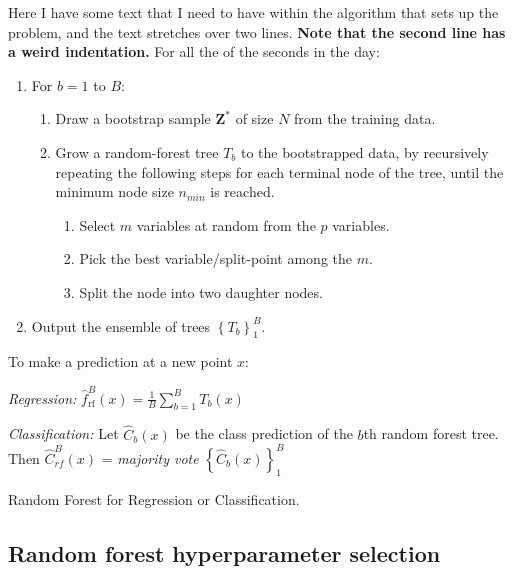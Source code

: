 \begin{algorithm}
    \footnotesize
    \begin{minipage}{.92\linewidth}
    Here I have some text that I need to have within the algorithm that
    sets up the problem, and the text stretches over two  lines.
    \textbf{Note that the second line has a weird indentation.}
    \BlankLine
    For all the of the seconds in the day:
    \begin{enumerate}
        \item For $b = 1$ to $B$:
        \begin{enumerate}
            \item Draw a bootstrap sample $\bm{Z}^{*}$ of size $N$ from the training data.
            \item Grow a random-forest tree $T_b$ to the bootstrapped data, by recursively repeating the following steps for each terminal node of the tree, until the minimum node size $n_{min}$ is reached.
            \begin{enumerate}
                \item Select $m$ variables at random from the $p$ variables.
                \item Pick the best variable/split-point among the $m$.
                \item Split the node into two daughter nodes.
            \end{enumerate}
        \end{enumerate}
        \item Output the ensemble of trees $\left\{ T _ { b } \right\} _ { 1 } ^ { B }$.
    \end{enumerate}
    To make a prediction at a new point $x$:

    \textit{Regression:} $\hat { f } _ { \mathrm { rf } } ^ { B } ( x ) = \frac { 1 } { B } \sum _ { b = 1 } ^ { B } T _ { b } ( x )$

    \textit{Classification:} Let $\hat { C } _ { b } ( x )$ be the class prediction of the $b$th random forest
    tree. Then $\hat{C} _ { r f } ^ { B } ( x )$ = \textit{majority vote} $\left\{ \hat { C } _ { b } ( x ) \right\} _ { 1 } ^ { B }$
    \end{minipage}
    \caption{\footnotesize Random Forest for Regression or Classification.}
    \label{alg:random_forest}
\end{algorithm}
\subsection{Random forest hyperparameter selection}
